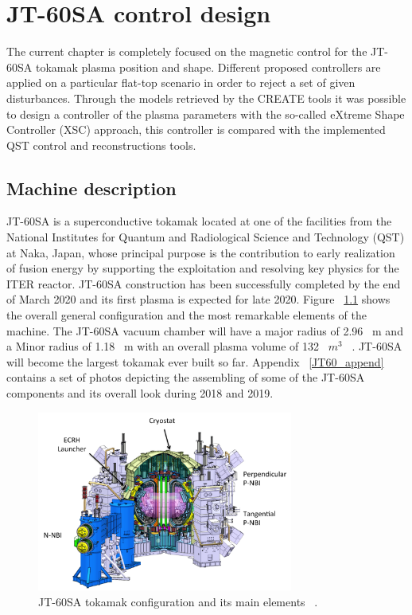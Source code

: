 \chapter{JT-60SA control design}

The current chapter is completely  focused on the magnetic control for  the JT-60SA tokamak  plasma position and shape. Different proposed  controllers  are applied  on a particular flat-top scenario in order to reject a set of given disturbances. Through the models retrieved by the CREATE tools it was possible to design a controller of the plasma parameters with the so-called eXtreme Shape Controller (XSC) approach, this controller is compared with the implemented QST control and reconstructions tools.   

\section{Machine description}

JT-60SA is a superconductive tokamak located at one of the facilities from the National Institutes for Quantum and Radiological Science and Technology (QST)  at  Naka, Japan, whose principal purpose is  the contribution to early realization of fusion energy by supporting the exploitation and resolving key physics for the ITER reactor.  JT-60SA construction has been successfully completed by the end of March 2020 and its first plasma is expected for late 2020. Figure ~\ref{JT60schm} shows the overall general configuration and the most remarkable elements of the machine. The JT-60SA  vacuum chamber will have a major radius of 2.96~ m and a Minor radius of 1.18~ m with an overall plasma volume of 132~ $m^3$ ~\cite{Spears2014}. JT-60SA will become the largest tokamak ever built so far. Appendix ~\ref{JT60_append} contains a set of photos depicting the assembling of some of the JT-60SA components and its overall look during 2018 and 2019. 
\smallskip

\begin{figure}[h]
	\centering
	\includegraphics[width=0.75\textwidth]{Chp3/JT60SA.png}
	
	\caption{\label{JT60schm}JT-60SA tokamak configuration and its main elements ~\cite{JT60SA:ResearchPlan}.}
\end{figure}


